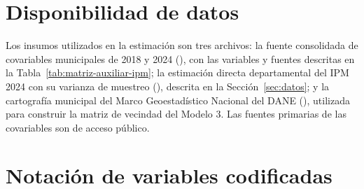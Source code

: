 \section{Disponibilidad de datos}
\label{sec:datos-apendice}

Los insumos utilizados en la estimación son tres archivos: la fuente consolidada de covariables municipales de 2018 y 2024 (\texttt{}), con las variables y fuentes descritas en la Tabla~\ref{tab:matriz-auxiliar-ipm}; la estimación directa departamental del IPM 2024 con su varianza de muestreo (\texttt{}), descrita en la Sección~\ref{sec:datos}; y la cartografía municipal del Marco Geoestadístico Nacional del DANE (\texttt{}), utilizada para construir la matriz de vecindad del Modelo 3. Las fuentes primarias de las covariables son de acceso público.

\section{Notación de variables codificadas}
\label{sec:tabla-variables-codificadas}


\begingroup
\small
\renewcommand{\arraystretch}{1.1}
\setlength{\tabcolsep}{5pt}

